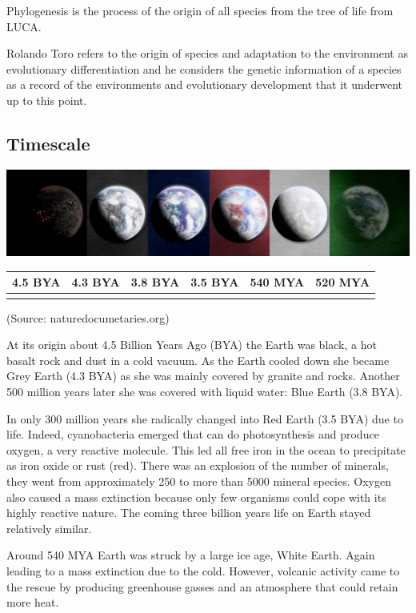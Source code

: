 \documentclass[
  11pt,
]{book}
\begin{document}
Phylogenesis is the process of the origin of all species from the tree of life from LUCA.

Rolando Toro refers to the origin of species and adaptation to the environment as evolutionary differentiation and he considers the genetic information of a species as a record of the environments and evolutionary development that it underwent up to this point.

\hypertarget{timescale}{%
\subsection{Timescale}\label{timescale}}

\includegraphics{./figs/liferockystartstrip.jpeg}

\begin{longtable}[]{@{}llllll@{}}
\toprule()
4.5 BYA & 4.3 BYA & 3.8 BYA & 3.5 BYA & 540 MYA & 520 MYA \\
\midrule()
\endhead
& & & & & \\
\bottomrule()
\end{longtable}

(Source: naturedocumetaries.org)

At its origin about 4.5 Billion Years Ago (BYA) the Earth was black, a hot basalt rock and dust in a cold vacuum.
As the Earth cooled down she became Grey Earth (4.3 BYA) as she was mainly covered by granite and rocks. Another 500 million years later she was covered with liquid water: Blue Earth (3.8 BYA).

In only 300 million years she radically changed into Red Earth (3.5 BYA) due to life. Indeed, cyanobacteria emerged that can do photosynthesis and produce oxygen, a very reactive molecule. This led all free iron in the ocean to precipitate as iron oxide or rust (red). There was an explosion of the number of minerals, they went from approximately 250 to more than 5000 mineral species. Oxygen also caused a mass extinction because only few organisms could cope with its highly reactive nature. The coming three billion years life on Earth stayed relatively similar.

Around 540 MYA Earth was struck by a large ice age, White Earth.
Again leading to a mass extinction due to the cold.
However, volcanic activity came to the rescue by producing greenhouse gasses and an atmosphere that could retain more heat.
\end{document}
